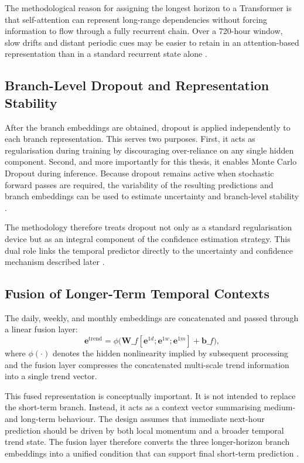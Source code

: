 \documentclass[12pt,a4paper]{report}
\begin{document}
The methodological reason for assigning the longest horizon to a Transformer is that self-attention can represent long-range dependencies without forcing information to flow through a fully recurrent chain. Over a 720-hour window, slow drifts and distant periodic cues may be easier to retain in an attention-based representation than in a standard recurrent state alone \cite{vaswani2017attention,zhao2026transformers,kim2025dltimeseries}.

\subsection{Branch-Level Dropout and Representation Stability}

After the branch embeddings are obtained, dropout is applied independently to each branch representation. This serves two purposes. First, it acts as regularisation during training by discouraging over-reliance on any single hidden component. Second, and more importantly for this thesis, it enables Monte Carlo Dropout during inference. Because dropout remains active when stochastic forward passes are required, the variability of the resulting predictions and branch embeddings can be used to estimate uncertainty and branch-level stability \cite{gal2016dropout}.

The methodology therefore treats dropout not only as a standard regularisation device but as an integral component of the confidence estimation strategy. This dual role links the temporal predictor directly to the uncertainty and confidence mechanism described later \cite{gal2016dropout}.

\subsection{Fusion of Longer-Term Temporal Contexts}

The daily, weekly, and monthly embeddings are concatenated and passed through a linear fusion layer:
\[
\mathbf{e}^{\text{trend}}
=
\phi\big(
\mathbf{W}\_f
[
\mathbf{e}^{1d}; \mathbf{e}^{1w}; \mathbf{e}^{1m}
]
+
\mathbf{b}\_f
\big),
\]
where \(\phi(\cdot)\) denotes the hidden nonlinearity implied by subsequent processing and the fusion layer compresses the concatenated multi-scale trend information into a single trend vector.

This fused representation is conceptually important. It is not intended to replace the short-term branch. Instead, it acts as a context vector summarising medium- and long-term behaviour. The design assumes that immediate next-hour prediction should be driven by both local momentum and a broader temporal trend state. The fusion layer therefore converts the three longer-horizon branch embeddings into a unified condition that can support final short-term prediction \cite{huang2021multiresolution,lim2021tft}.
\end{document}
